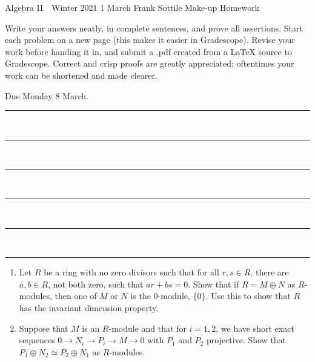 \documentclass[12pt]{article}
\newcommand{\barsl}{\noindent\begin{minipage}[t]{575pt}
{\color{violet}\rule{575pt}{1.2pt}}\vspace{-5.7mm}\\
{\color{blue}\rule{575pt}{1.2pt}}\vspace{-5.7mm}\\
{\color{green}\rule{575pt}{1.2pt}}\vspace{-5.7mm}\\
{\color{yellow}\rule{575pt}{1.2pt}}\vspace{-5.7mm}\\
{\color{orange}\rule{575pt}{1.2pt}}\vspace{-5.7mm}\\
{\color{red}\rule{575pt}{1.2pt}}
\end{minipage}}
\begin{document}
\LARGE 
\noindent
Algebra II\ \ Winter 2021 \hfill 1 March\makebox[40pt][l]{\ }\newline
Frank Sottile \hfill
\Large\sf
Make-up Homework\makebox[40pt][l]{\ }
\vspace{5pt}
\normalsize

\noindent
Write your answers neatly, in complete sentences, and prove all assertions.
Start each problem on a new page (this makes it easier in Gradescope).
Revise your work before handing it in, and submit a .pdf  created from a LaTeX source to Gradescope.
Correct and crisp proofs are greatly appreciated; oftentimes your work can be shortened and made clearer.\vspace{20pt}

\vspace{20pt}

\noindent
{\color{red}Due Monday 8 March.}\vspace{1pt}

\barsl

\begin{enumerate}


 \item Let $R$ be a ring with no zero divisors such that for all $r,s\in R$, there are $a,b\in R$, not both zero, such that $ar+bs=0$.
   Show that if $R=M\oplus N$ as $R$-modules, then one of $M$ or $N$ is the 0-module, $\{0\}$.
   Use this to show that $R$ has the invariant dimension property. 
   \vspace{-2pt}

 \item Suppose that $M$ is an $R$-module and that for $i=1,2$, we have short exact sequences
   $0\to N_i\to P_i\to M\to 0$ with $P_1$ and $P_2$ projective.
   Show that $P_1\oplus N_2\simeq P_2\oplus N_1$ as $R$-modules.
   \vspace{-2pt}

\end{enumerate}
\end{document}
